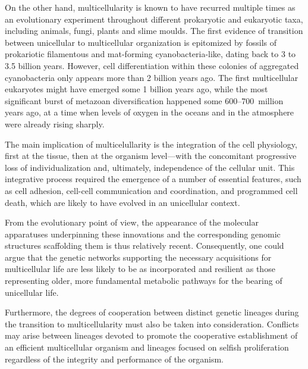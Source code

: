 \documentclass{tufte-book}
\begin{document}

On the other hand, multicellularity is known to have recurred multiple times as
an evolutionary experiment throughout different prokaryotic and eukaryotic taxa,
including animals, fungi, plants and slime moulds.\cite{kaiser_building_2001}
The first evidence of transition between unicellular to multicellular
organization is epitomized by fossils of prokariotic filamentous and
\mbox{mat-forming} \mbox{cyanobacteria-like}, dating back to 3 to 3.5 billion
years.\cite{knoll_life_2003,schopf_microfossils_1993} However, cell
differentiation within these colonies of aggregated cyanobacteria only appears
more than 2 billion years ago.\cite{tomitani_evolutionary_2006} The first
multicellular eukaryotes might have emerged some 1 billion years
ago\cite{knoll_eukaryotic_2006}, while the most significant burst of metazoan
diversification happened some \mbox{600--700~million} years ago, at a time when
levels of oxygen in the oceans and in the atmosphere were already rising
sharply.\cite{carroll_chance_2001,king_unicellular_2004}

The main implication of multicelullarity is the integration of the cell
physiology, first at the tissue, then at the organism level---with the
concomitant progressive loss of individualization and, ultimately, independence
of the cellular unit.  This integrative process required the emergence of a
number of essential features, such as cell adhesion, \mbox{cell-cell}
communication and coordination, and programmed cell death, which are likely to
have evolved in an unicellular
context.\cite{bonner_development:_1974,bonner_first_2009,kaiser_building_2001}

From the evolutionary point of view, the appearance of the molecular apparatuses
underpinning these innovations and the corresponding genomic structures
scaffolding them is thus relatively recent.  Consequently, one could argue that
the genetic networks supporting the necessary acquisitions for multicellular
life are less likely to be as incorporated and resilient as those representing
older, more fundamental metabolic pathways for the bearing of unicellular life.

Furthermore, the degrees of cooperation between distinct genetic lineages during
the transition to multicellularity must also be taken into consideration.
Conflicts may arise between lineages devoted to promote the cooperative
establishment of an efficient multicellular organism and lineages focused on
selfish proliferation regardless of the integrity and performance of the
organism.\cite{buss_evolution_1987,hammerstein_genetic_2003}
\end{document}
